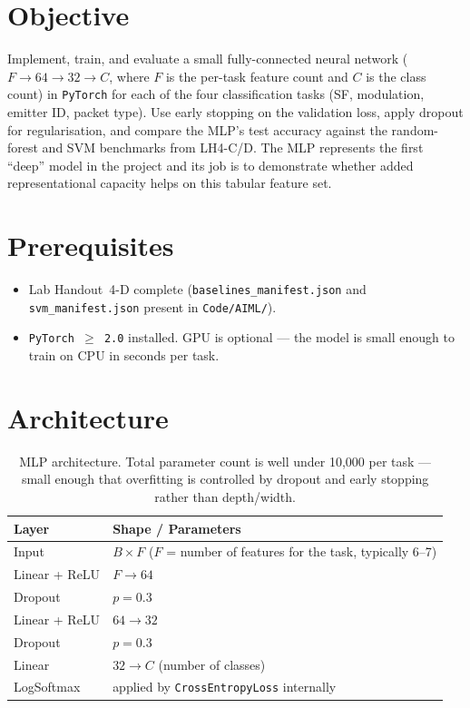 \documentclass[11pt,letterpaper]{article}
\begin{document}

\section{Objective}
Implement, train, and evaluate a small fully-connected neural network ($F\to64\to32\to C$, where $F$ is the per-task feature count and $C$ is the class count) in \texttt{PyTorch} for each of the four classification tasks (SF, modulation, emitter ID, packet type). Use early stopping on the validation loss, apply dropout for regularisation, and compare the \mbox{MLP}'s test accuracy against the random-forest and \mbox{SVM} benchmarks from LH4-C/D. The \mbox{MLP} represents the first ``deep'' model in the project and its job is to demonstrate whether added representational capacity helps on this tabular feature set.

\section{Prerequisites}
\begin{itemize}[leftmargin=2em]
	\item Lab Handout~4-D complete (\texttt{baselines\_manifest.json} and \texttt{svm\_manifest.json} present in \texttt{Code/AIML/}).
	\item \texttt{PyTorch $\geq$ 2.0} installed. \mbox{GPU} is optional --- the model is small enough to train on \mbox{CPU} in seconds per task.
\end{itemize}

\section{Architecture}
\begin{table}[h!]
	\centering
	\renewcommand{\arraystretch}{1.3}
	\begin{tabularx}{\textwidth}{l X}
		\toprule
		\textbf{Layer} & \textbf{Shape / Parameters} \\
		\midrule
		Input           & $B \times F$ ($F$ = number of features for the task, typically 6--7) \\
		Linear + ReLU   & $F \to 64$ \\
		Dropout         & $p = 0.3$ \\
		Linear + ReLU   & $64 \to 32$ \\
		Dropout         & $p = 0.3$ \\
		Linear          & $32 \to C$ (number of classes) \\
		LogSoftmax      & applied by \texttt{CrossEntropyLoss} internally \\
		\bottomrule
	\end{tabularx}
	\caption{MLP architecture. Total parameter count is well under 10{,}000 per task --- small enough that overfitting is controlled by dropout and early stopping rather than depth/width.}
\end{table}
\end{document}
